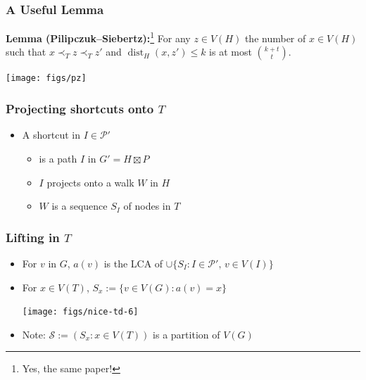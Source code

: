 \documentclass[xcolor=dvipsnames]{beamer}
\begin{document}
\begin{frame}
  \frametitle{A Useful Lemma}
  
  \textbf{Lemma (Pilipczuk--Siebertz):}\footnote{Yes, the same paper!} For any $z\in V(H)$ the number of $x\in V(H)$ such that $x\prec_T z\prec_T z'$ and $\mathop{dist}_H(x,z')\le k$ is at most $\binom{k+t}{t}$.
  \begin{center}
    \texttt{[image: figs/pz]}%
  \end{center}
\end{frame}




\begin{frame}
  \frametitle{Projecting shortcuts onto $T$}
  
  \begin{itemize}
    \item A shortcut in $I\in\mathcal{P'}$
    \begin{itemize}
      \item<2-> is a path $I$ in $G'=H\boxtimes P$
      \item<3-> $I$ projects onto a walk $W$ in $H$
      \item<4-> $W$ is a sequence $S_I$ of nodes in $T$
    \end{itemize}
  \end{itemize}
  \begin{center}
  \end{center}
\end{frame}

\begin{frame}
  \frametitle{Lifting in $T$}
  \begin{itemize}
    \item For $v$ in $G$, $a(v)$ is the LCA of $\cup\{S_I:I\in\mathcal{P'},\, v\in V(I)\}$
    \item For $x\in V(T)$, $S_x:=\{v\in V(G): a(v)=x\}$
    \begin{center}
      \texttt{[image: figs/nice-td-6]}%
    \end{center}
    \item Note: $\mathcal{S}:=(S_x:x\in V(T))$ is a partition of $V(G)$
\end{itemize}
\end{frame}
\end{document}
